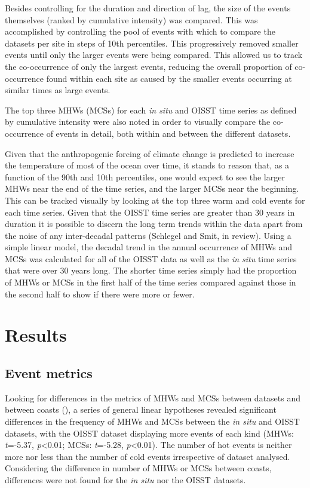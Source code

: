\documentclass[a4paper,10pt,review]{elsarticle}
\begin{document}
Besides controlling for the duration and direction of lag, the size of the events themselves (ranked by cumulative intensity) was compared. This was accomplished by controlling the pool of events with which to compare the datasets per site in steps of 10th percentiles. This progressively removed smaller events until only the larger events were being compared. This allowed us to track the co-occurrence of only the largest events, reducing the overall proportion of co-occurrence found within each site as caused by the smaller events occurring at similar times as large events.

The top three MHWs (MCSs) for each \emph{in situ} and OISST time series as defined by cumulative intensity were also noted in order to visually compare the co-occurrence of events in detail, both within and between the different datasets.

Given that the anthropogenic forcing of climate change is predicted to increase the temperature of most of the ocean over time, it stands to reason that, as a function of the 90th and 10th percentiles, one would expect to see the larger MHWs near the end of the time series, and the larger MCSs near the beginning. This can be tracked visually by looking at the top three warm and cold events for each time series. Given that the OISST time series are greater than 30 years in duration it is possible to discern the long term trends within the data apart from the noise of any inter-decadal patterns (Schlegel and Smit, in review). Using a simple linear model, the decadal trend in the annual occurrence of MHWs and MCSs was calculated for all of the OISST data as well as the \emph{in situ} time series that were over 30 years long. The shorter time series simply had the proportion of MHWs or MCSs in the first half of the time series compared against those in the second half to show if there were more or fewer.

\section{Results}

\subsection{Event metrics}
Looking for differences in the metrics of MHWs and MCSs between datasets and between coasts (), a series of general linear hypotheses \citep{Hothorn2008} revealed significant differences in the frequency of MHWs and MCSs between the \emph{in situ} and OISST datasets, with the OISST dataset displaying more events of each kind (MHWs: \emph{t}=-5.37, \emph{p}<0.01; MCSs: \emph{t}=-5.28, \emph{p}<0.01). The number of hot events is neither more nor less than the number of cold events irrespective of dataset analysed. Considering the difference in number of MHWs or MCSs between coasts, differences were not found for the \emph{in situ} nor the OISST datasets.
\end{document}
